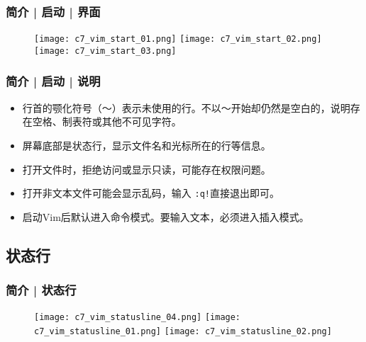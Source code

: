 \begin{frame}
  \frametitle{简介 | 启动 | 界面}
  \begin{figure}
    \centering
    \texttt{[image: c7\_vim\_start\_01.png]}\quad
    \texttt{[image: c7\_vim\_start\_02.png]}\\
    \texttt{[image: c7\_vim\_start\_03.png]}
  \end{figure}
\end{frame}

\begin{frame}[fragile]
  \frametitle{简介 | 启动 | 说明}
  \begin{itemize}[<+->]
    \item 行首的颚化符号（～）表示未使用的行。不以～开始却仍然是空白的，说明存在空格、制表符或其他不可见字符。
    \item 屏幕底部是状态行，显示文件名和光标所在的行等信息。
    \item 打开文件时，拒绝访问或显示只读，可能存在权限问题。
    \item 打开非文本文件可能会显示乱码，输入 \verb|:q!|直接退出即可。
    \item 启动Vim后默认进入命令模式。要输入文本，必须进入插入模式。
  \end{itemize}
\end{frame}

\subsection{状态行}
\begin{frame}
  \frametitle{简介 | 状态行}
  \begin{figure}
    \centering
    \texttt{[image: c7\_vim\_statusline\_04.png]}
    \vspace{0.2cm}
    \texttt{[image: c7\_vim\_statusline\_01.png]}
    \vspace{0.2cm}
    \texttt{[image: c7\_vim\_statusline\_02.png]}
  \end{figure}
\end{frame}

